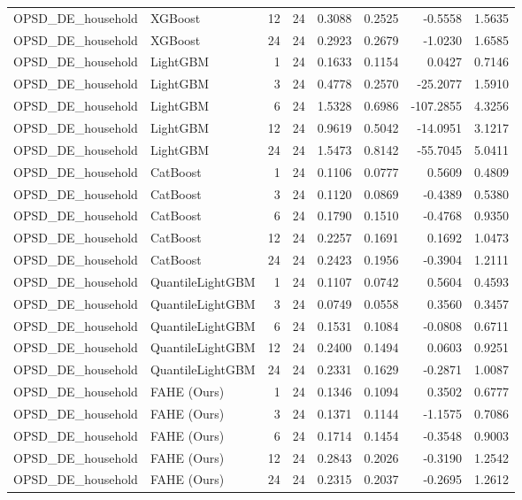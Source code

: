 \begin{tabular}{llrrrrrr}
OPSD_DE_household & XGBoost & 12 & 24 & 0.3088 & 0.2525 & -0.5558 & 1.5635 \\
OPSD_DE_household & XGBoost & 24 & 24 & 0.2923 & 0.2679 & -1.0230 & 1.6585 \\
OPSD_DE_household & LightGBM & 1 & 24 & 0.1633 & 0.1154 & 0.0427 & 0.7146 \\
OPSD_DE_household & LightGBM & 3 & 24 & 0.4778 & 0.2570 & -25.2077 & 1.5910 \\
OPSD_DE_household & LightGBM & 6 & 24 & 1.5328 & 0.6986 & -107.2855 & 4.3256 \\
OPSD_DE_household & LightGBM & 12 & 24 & 0.9619 & 0.5042 & -14.0951 & 3.1217 \\
OPSD_DE_household & LightGBM & 24 & 24 & 1.5473 & 0.8142 & -55.7045 & 5.0411 \\
OPSD_DE_household & CatBoost & 1 & 24 & 0.1106 & 0.0777 & 0.5609 & 0.4809 \\
OPSD_DE_household & CatBoost & 3 & 24 & 0.1120 & 0.0869 & -0.4389 & 0.5380 \\
OPSD_DE_household & CatBoost & 6 & 24 & 0.1790 & 0.1510 & -0.4768 & 0.9350 \\
OPSD_DE_household & CatBoost & 12 & 24 & 0.2257 & 0.1691 & 0.1692 & 1.0473 \\
OPSD_DE_household & CatBoost & 24 & 24 & 0.2423 & 0.1956 & -0.3904 & 1.2111 \\
OPSD_DE_household & QuantileLightGBM & 1 & 24 & 0.1107 & 0.0742 & 0.5604 & 0.4593 \\
OPSD_DE_household & QuantileLightGBM & 3 & 24 & 0.0749 & 0.0558 & 0.3560 & 0.3457 \\
OPSD_DE_household & QuantileLightGBM & 6 & 24 & 0.1531 & 0.1084 & -0.0808 & 0.6711 \\
OPSD_DE_household & QuantileLightGBM & 12 & 24 & 0.2400 & 0.1494 & 0.0603 & 0.9251 \\
OPSD_DE_household & QuantileLightGBM & 24 & 24 & 0.2331 & 0.1629 & -0.2871 & 1.0087 \\
OPSD_DE_household & FAHE (Ours) & 1 & 24 & 0.1346 & 0.1094 & 0.3502 & 0.6777 \\
OPSD_DE_household & FAHE (Ours) & 3 & 24 & 0.1371 & 0.1144 & -1.1575 & 0.7086 \\
OPSD_DE_household & FAHE (Ours) & 6 & 24 & 0.1714 & 0.1454 & -0.3548 & 0.9003 \\
OPSD_DE_household & FAHE (Ours) & 12 & 24 & 0.2843 & 0.2026 & -0.3190 & 1.2542 \\
OPSD_DE_household & FAHE (Ours) & 24 & 24 & 0.2315 & 0.2037 & -0.2695 & 1.2612 \\

\end{tabular}
